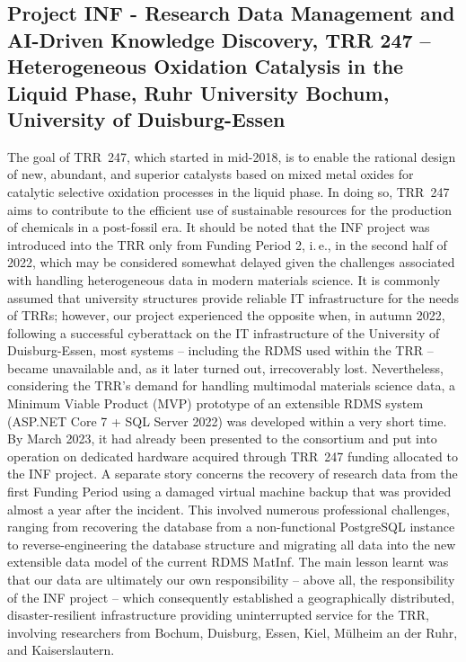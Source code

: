 \documentclass{eceasst}
\newcommand{\ie}{i.\,e.}
\begin{document}
\subsection{Project INF - Research Data Management and AI-Driven Knowledge Discovery, TRR 247 – Heterogeneous Oxidation Catalysis in the Liquid Phase, Ruhr University Bochum, University of Duisburg-Essen}
The goal of TRR~247, which started in mid-2018, is to enable the rational design of new, abundant, and superior catalysts based on mixed metal oxides for catalytic selective oxidation processes in the liquid phase.
In doing so, TRR~247 aims to contribute to the efficient use of sustainable resources for the production of chemicals in a post-fossil era.
It should be noted that the INF project was introduced into the TRR only from Funding Period 2, \ie, in the second half of 2022, which may be considered somewhat delayed given the challenges associated with handling heterogeneous data in modern materials science.
It is commonly assumed that university structures provide reliable IT infrastructure for the needs of TRRs; however, our project experienced the opposite when, in autumn 2022, following a successful cyberattack on the IT infrastructure of the University of Duisburg-Essen, most systems – including the RDMS used within the TRR – became unavailable and, as it later turned out, irrecoverably lost.
Nevertheless, considering the TRR’s demand for handling multimodal materials science data, a Minimum Viable Product (MVP) prototype of an extensible RDMS system (ASP.NET Core 7 + SQL Server 2022) was developed within a very short time.
By March 2023, it had already been presented to the consortium and put into operation on dedicated hardware acquired through TRR~247 funding allocated to the INF project.
A separate story concerns the recovery of research data from the first Funding Period using a damaged virtual machine backup that was provided almost a year after the incident.
This involved numerous professional challenges, ranging from recovering the database from a non-functional PostgreSQL instance to reverse-engineering the database structure and migrating all data into the new extensible data model of the current RDMS MatInf.
The main lesson learnt was that our data are ultimately our own responsibility – above all, the responsibility of the INF project – which consequently established a geographically distributed, disaster-resilient infrastructure providing uninterrupted service for the TRR, involving researchers from Bochum, Duisburg, Essen, Kiel, Mülheim an der Ruhr, and Kaiserslautern.
\end{document}
